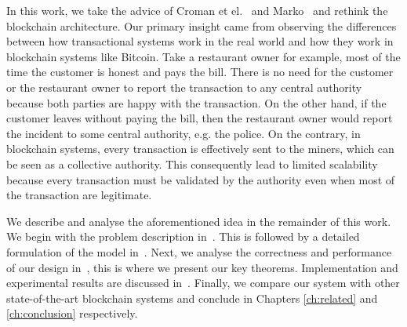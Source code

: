 In this work, we take the advice of Croman et el.~\cite{croman2016scaling} and Marko~\cite{vukolic2015quest} and rethink the blockchain architecture.
Our primary insight came from observing the differences between how transactional systems work in the real world and how they work in blockchain systems like Bitcoin. 
Take a restaurant owner for example, most of the time the customer is honest and pays the bill.
There is no need for the customer or the restaurant owner to report the transaction to any central authority 
because both parties are happy with the transaction.
On the other hand, if the customer leaves without paying the bill,
then the restaurant owner would report the incident to some central authority, e.g. the police.
On the contrary, in blockchain systems, every transaction is effectively sent to the miners,
which can be seen as a collective authority.
This consequently lead to limited scalability because every transaction must be validated by the authority even when most of the transaction are legitimate.

We describe and analyse the aforementioned idea in the remainder of this work.
We begin with the problem description in~.
This is followed by a detailed formulation of the model in~. 
Next, we analyse the correctness and performance of our design in~, this is where we present our key theorems.
Implementation and experimental results are discussed in~.
Finally, we compare our system with other state-of-the-art blockchain systems and conclude in Chapters \ref{ch:related} and \ref{ch:conclusion} respectively.




